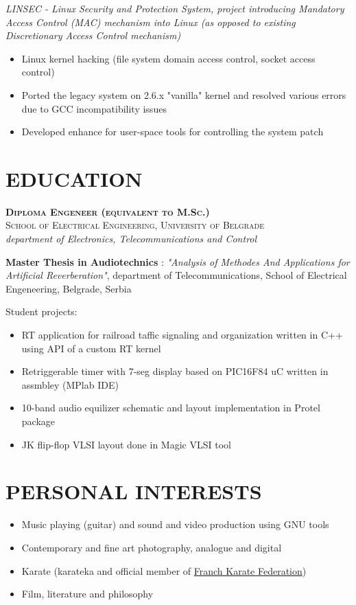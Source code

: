 \documentclass[a4paper, oneside, final]{scrartcl}
\begin{document}
\medskip

   \textit{LINSEC - Linux Security and Protection System, project introducing 
            Mandatory Access Control (MAC) mechanism into Linux 
            (as opposed to existing Discretionary Access Control mechanism)}
\begin{itemize}
   \item Linux kernel hacking (file system domain access control, socket access control)
   \item Ported the legacy system on 2.6.x "vanilla" kernel and 
            resolved various errors due to GCC incompatibility issues
   \item Developed enhance for user-space tools for controlling the system patch
\end{itemize}


\section{EDUCATION}

   \textbf{\textsc{Diploma Engeneer (equivalent to M.Sc.)}} \\
   \textsc{School of Electrical Engineering, University of Belgrade} \\
   \textit{department of Electronics, Telecommunications and Control}

   \textbf{Master Thesis in Audiotechnics} : \textit{"Analysis of Methodes And 
         Applications for Artificial Reverberation"}, department of 
         Telecommunications, School of Electrical Engeneering, Belgrade, Serbia

\medskip
   
   Student projects:

\begin{itemize}
   \item RT application for railroad taffic signaling 
            and organization written in C++ using API of a custom RT kernel
   \item Retriggerable timer with 7-seg display 
            based on PIC16F84 uC written in assmbley (MPlab IDE)
   \item 10-band audio equilizer schematic and 
            layout implementation in Protel package
   \item JK flip-flop VLSI layout done in Magic VLSI tool
\end{itemize}


\section{PERSONAL INTERESTS}
\begin{itemize}
   \item Music playing (guitar) and sound and video production using GNU
            tools
   \item Contemporary and fine art photography, analogue and digital 
   \item Karate (karateka and official member of
         \href{http://www.ffkarate.fr/}{Franch Karate Federation})
   \item Film, literature and philosophy
\end{itemize}
\end{document}
